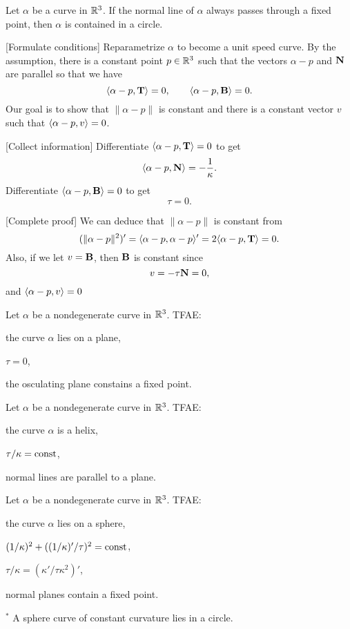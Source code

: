 \documentclass{../exp}
\def\a{\alpha}
\begin{document}
\begin{ex}
Let $\a$ be a curve in $\mathbb{R}^3$.
If the normal line of $\a$ always passes through a fixed point, then $\a$ is contained in a circle.
\end{ex}
\begin{pf}
[Formulate conditions]
Reparametrize $\a$ to become a unit speed curve.
By the assumption, there is a constant point $p\in\mathbb{R}^3$ such that the vectors $\a-p$ and $\mathbf{N}$ are parallel so that we have
\[\<\a-p,\bT\>=0,\qquad\<\a-p,\bB\>=0.\]
Our goal is to show that $\|\a-p\|$ is constant and there is a constant vector $v$ such that $\<\a-p,v\>=0$.

[Collect information]
Differentiate $\<\a-p,\bT\>=0$ to get
\[\<\a-p,\bN\>=-\frac1\kappa.\]
Differentiate $\<\a-p,\bB\>=0$ to get
\[\tau=0.\]

[Complete proof]
We can deduce that $\|\a-p\|$ is constant from
\[(\|\a-p\|^2)'=\<\a-p,\a-p\>'=2\<\a-p,\bT\>=0.\]
Also, if we let $v=\mathbf{B}$, then $\mathbf{B}$ is constant since
\[v=-\tau\mathbf{N}=0,\]
and $\<\a-p,v\>=0$
\end{pf}

\begin{ex}
Let $\a$ be a nondegenerate curve in $\mathbb{R}^3$.
TFAE:
\begin{cond}
\item the curve $\alpha$ lies on a plane,
\item $\tau=0$,
\item the osculating plane constains a fixed point.
\end{cond}
\end{ex}


\begin{ex}[Helices]
Let $\a$ be a nondegenerate curve in $\mathbb{R}^3$.
TFAE:
\begin{cond}
\item the curve $\a$ is a helix,
\item $\tau/\kappa=\operatorname{const}$,
\item normal lines are parallel to a plane.
\end{cond}
\end{ex}

\begin{ex}
Let $\a$ be a nondegenerate curve in $\mathbb{R}^3$.
TFAE:
\begin{cond}
\item the curve $\a$ lies on a sphere,
\item $(1/\kappa)^2+((1/\kappa)'/\tau)^2=\operatorname{const}$,
\item $\tau/\kappa=(\kappa'/\tau\kappa^2)'$,
\item normal planes contain a fixed point.
\end{cond}
$^*$ A sphere curve of constant curvature lies in a circle.
\end{ex}
\end{document}

